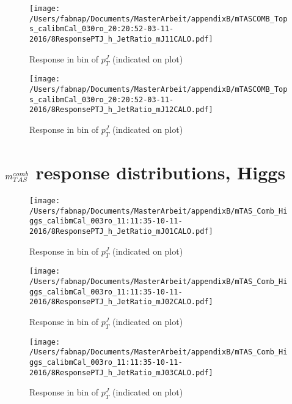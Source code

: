 \begin{figure}

\texttt{[image: /Users/fabnap/Documents/MasterArbeit/appendixB/mTASCOMB\_Tops\_calibmCal\_030ro\_20:20:52-03-11-2016/8ResponsePTJ\_h\_JetRatio\_mJ11CALO.pdf]}
\caption{Response in bin of  $p_{T}^{J}$ (indicated on plot)} 

\end{figure}

\begin{figure}

\texttt{[image: /Users/fabnap/Documents/MasterArbeit/appendixB/mTASCOMB\_Tops\_calibmCal\_030ro\_20:20:52-03-11-2016/8ResponsePTJ\_h\_JetRatio\_mJ12CALO.pdf]}
\caption{Response in bin of  $p_{T}^{J}$ (indicated on plot)} 

\end{figure}
\clearpage
\onecolumn
\vspace*{\fill}
\section{$m^{comb}_{TAS}$ response distributions, Higgs}
\vfill
\clearpage
\twocolumn
 \clearpage %
\begin{figure}

\texttt{[image: /Users/fabnap/Documents/MasterArbeit/appendixB/mTAS\_Comb\_Higgs\_calibmCal\_003ro\_11:11:35-10-11-2016/8ResponsePTJ\_h\_JetRatio\_mJ01CALO.pdf]}
\caption{Response in bin of  $p_{T}^{J}$ (indicated on plot)} 

\end{figure}

\begin{figure}

\texttt{[image: /Users/fabnap/Documents/MasterArbeit/appendixB/mTAS\_Comb\_Higgs\_calibmCal\_003ro\_11:11:35-10-11-2016/8ResponsePTJ\_h\_JetRatio\_mJ02CALO.pdf]}
\caption{Response in bin of  $p_{T}^{J}$ (indicated on plot)} 

\end{figure}

\begin{figure}

\texttt{[image: /Users/fabnap/Documents/MasterArbeit/appendixB/mTAS\_Comb\_Higgs\_calibmCal\_003ro\_11:11:35-10-11-2016/8ResponsePTJ\_h\_JetRatio\_mJ03CALO.pdf]}
\caption{Response in bin of  $p_{T}^{J}$ (indicated on plot)} 

\end{figure}


